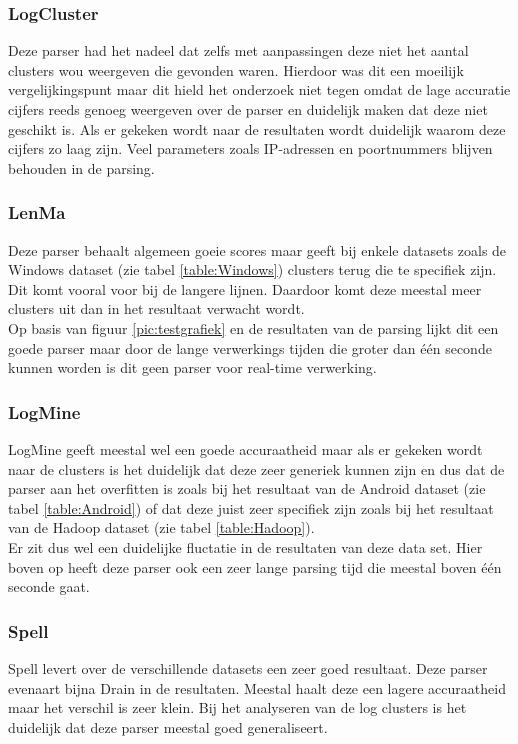 \subsubsection{LogCluster}
Deze parser had het nadeel dat zelfs met aanpassingen deze niet het aantal clusters wou weergeven die gevonden waren. Hierdoor was dit een moeilijk vergelijkingspunt maar dit hield het onderzoek niet tegen omdat de lage accuratie cijfers reeds genoeg weergeven over de parser en duidelijk maken dat deze niet geschikt is. Als er gekeken wordt naar de resultaten wordt duidelijk waarom deze cijfers zo laag zijn. Veel parameters zoals IP-adressen en poortnummers blijven behouden in de parsing.

\subsubsection{LenMa}
Deze parser behaalt algemeen goeie scores maar geeft bij enkele datasets zoals de Windows dataset (zie tabel \ref{table:Windows}) clusters terug die te specifiek zijn. Dit komt vooral voor bij de langere lijnen. Daardoor komt deze meestal meer clusters uit dan in het resultaat verwacht wordt.\\

Op basis van figuur \ref{pic:testgrafiek} en de resultaten van de parsing lijkt dit een goede parser maar door de lange verwerkings tijden die groter dan één seconde kunnen worden is dit geen parser voor real-time verwerking.

\subsubsection{LogMine}
LogMine geeft meestal wel een goede accuraatheid maar als er gekeken wordt naar de clusters is het duidelijk dat deze zeer generiek kunnen zijn en dus dat de parser aan het overfitten is zoals bij het resultaat van de Android dataset (zie tabel \ref{table:Android}) of dat deze juist zeer specifiek zijn zoals bij het resultaat van de Hadoop dataset (zie tabel \ref{table:Hadoop}).\\

Er zit dus wel een duidelijke fluctatie in de resultaten van deze data set. Hier boven op heeft deze parser ook een zeer lange parsing tijd die meestal boven één seconde gaat.

\subsubsection{Spell}
Spell levert over de verschillende datasets een zeer goed resultaat. Deze parser evenaart bijna Drain in de resultaten. Meestal haalt deze een lagere accuraatheid maar het verschil is zeer klein. Bij het analyseren van de log clusters is het duidelijk dat deze parser meestal goed generaliseert.\\

